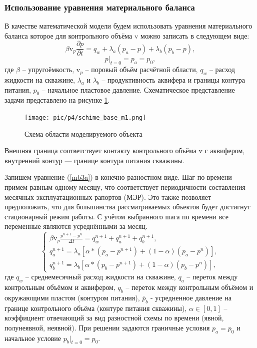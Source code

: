 \documentclass[14pt]{article}
\begin{document}
\subsubsection{Использование уравнения материального баланса} 
В качестве математической модели будем использовать уравнения материального баланса которое для контрольного объёма $\mathrm{v}$ можно записать в следующем виде:
\begin{equation}\label{mb3a}
		\beta \mathrm{v}_p\frac{\partial p}{\partial t} = q_w + \lambda_a(p_a-p)+ \lambda_b(p_b-p),
\end{equation}
\begin{equation}\label{mb3a_gy_ny}
	p|_{t=0} = p_a = p_0, 
\end{equation}
где $\beta$ -- упругоёмкость,  $\mathrm{v}_p$ -- поровый объём расчётной области, $q_w$ -- расход жидкости на скважине, $\lambda_a$ и $\lambda_b$ -- продуктивность аквифера и границы контура питания, $p_0$ -- начальное пластовое давление. Схематическое представление задачи представлено на рисунке \ref{fig:schime_m1}.
 \begin{figure}[!htb]
	\centering
	\texttt{[image: pic/p4/schime\_base\_m1.png]}
	\caption{Схема области моделируемого объекта}
	\label{fig:schime_m1}
\end{figure}
Внешняя граница соответствует контакту контрольного объёма $\mathrm{v}$ с аквифером, внутренний контур --- границе контура питания скважины.  

Запишем уравнение (\ref{mb3a}) в конечно-разностном виде. Шаг по времени примем равным одному месяцу, что соответствует периодичности составления месячных эксплуатационных рапортов (МЭР). Это также позволяет предположить, что для большинства рассматриваемых объектов будет достигнут стационарный режим работы.
С учётом выбранного шага по времени все переменные являются усреднёнными за месяц.
\begin{equation}\label{mb3}
	\begin{cases}
		\beta \mathrm{v}_p\frac{p^{n+1} - p^n}{\Delta t} = q_w^{n+1} + q_a^{n+1} + q_b^{n+1},
		\\
		q_a^{n+1} = \lambda_a \left[\alpha*\left(p_a - p^{n+1}\right) + \left(1-\alpha\right)\left(p_a - p^n\right)\right],
		\\
		q_b^{n+1} = \lambda_b \left[\alpha*\left(p_b - p^{n+1}\right) + \left(1-\alpha\right)\left(p_b - p^n\right)\right],
	\end{cases}
\end{equation}
где $q_w$ -- среднемесячный расход жидкости на скважине, $q_a$ -- переток между контрольным объёмом и аквифером, $q_b$ -- переток между контрольным объёмом и окружающими пластом (контуром питания),
 $\bar{p}_b$ - усредненное давление на границе контрольного объёма (контуре питания скважины), $\alpha \in[0,1]$ -- коэффициент отвечающий за вид разностной схемы по времени (явной, полунеявной, неявной). При решении задаются граничные условия $p_a = p_0$ и начальное условие $p_b|_{t=0} = p_0$.
\end{document}
